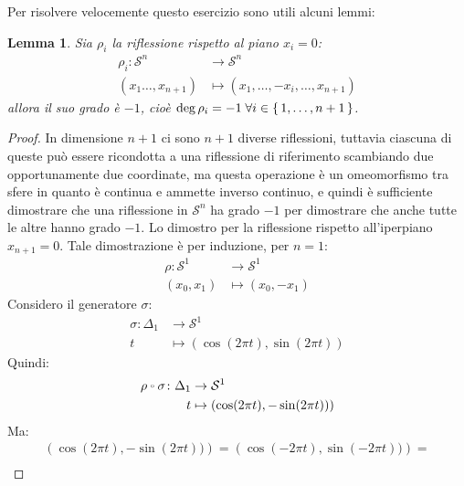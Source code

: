 \documentclass[10pt, toc=sectionentrywithdots]{scrartcl}
\newcounter{lemmac}
\newtheorem{lemma}[lemmac]{Lemma}
\newcommand{\Sph}[1][]{\mathcal{S}^#1}
\let\latexcirc=\circ
\newcommand{\ccirc}{\mathbin{\mathchoice
  {\xcirc\scriptstyle}
  {\xcirc\scriptstyle}
  {\xcirc\scriptscriptstyle}
  {\xcirc\scriptscriptstyle}
}}
\newcommand{\xcirc}[1]{\vcenter{\hbox{$#1\latexcirc$}}}
\let\circ\ccirc
\begin{document}
Per risolvere velocemente questo esercizio sono utili alcuni lemmi:
\begin{lemma}
  Sia $ \rho_i $ la riflessione rispetto al piano $ x_i = 0 $:
  \begin{align*}
    \rho_i \colon \Sph{n} & \to \Sph{n} \\
    (x_1\dots, x_{n+1}) & \mapsto (x_1,\dots,-x_i, \dots, x_{n+1})
  \end{align*}
  allora il suo grado è $ -1 $, cioè $ \deg \rho_i = -1 \; \forall i \in \set{1, \dots, n+1} $.
\end{lemma}
\begin{proof}
  In dimensione $ n + 1 $ ci sono $ n + 1 $ diverse riflessioni, tuttavia
  ciascuna di queste può essere ricondotta a una riflessione di riferimento
  scambiando due opportunamente due coordinate, ma questa operazione è
  un omeomorfismo tra sfere in quanto è continua e ammette inverso continuo,
  e quindi è sufficiente dimostrare che una riflessione in $\Sph{n} $
  ha grado $ - 1 $ per dimostrare che anche tutte le altre hanno grado $ - 1 $.
  Lo dimostro per la riflessione rispetto all'iperpiano $ x_{n+1} = 0 $.
  Tale dimostrazione è per induzione, per $ n = 1 $:
  \begin{align*}
    \rho \colon \Sph{1} & \to \Sph{1} \\
    (x_0,x_1) & \mapsto (x_0, -x_1)
  \end{align*}
  Considero il generatore $ \sigma $:
  \begin{align*}
    \sigma \colon \Delta_1 & \to \Sph{1} \\
    t & \mapsto \left(\cos(2 \pi t), \sin(2 \pi t)\right)
  \end{align*}
  Quindi:
  \begin{align*}
    \rho \circ \sigma \colon \Delta_1 & \to \Sph{1} \\
    t & \mapsto \left(\cos(2 \pi t), -\sin(2 \pi t))\right)
  \end{align*}
  Ma:
  \begin{gather*}
    \left(\cos(2 \pi t), -\sin(2 \pi t))\right) = \left(\cos(-2 \pi t), \sin(-2 \pi t))\right) = \\

\end{gather*}
\end{proof}
\end{document}
